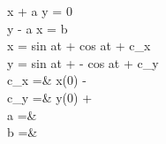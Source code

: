 \ddot x + a \dot y = 0\\
\ddot y - a \dot x = b\\


x =  sin at +  cos at + c_x\\


y =  sin at + - cos at +  c_y\\

c_x =& x(0) - \\
c_y =& y(0) + \\
a =& \\
b =& 
